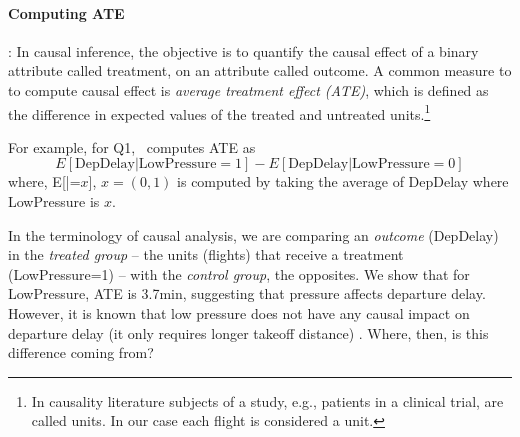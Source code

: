  \paragraph{ \bf Computing ATE}: In causal inference, the objective is to quantify
 the causal effect of a binary attribute called treatment, on an attribute called outcome.
 A common measure to to compute causal effect is {\em average treatment effect (ATE)}, which is defined as the difference in expected values of the treated and untreated units.\footnote{In causality literature subjects of a study,
  e.g., patients in a clinical trial, are called units. In our case each flight is considered a unit.}

 For example, for Q1, \GSQL\ computes ATE as $$E[\text{DepDelay}|\text{LowPressure}=1] - E[\text{DepDelay}|\text{LowPressure}=0]$$
  where, E[|=$x$], $x=(0,1)$ is computed by taking the average of  DepDelay where LowPressure is  $x$. 

In the terminology of causal analysis, we are comparing an
  \emph{outcome} (DepDelay) in the {\em treated group} -- the units
  (flights) that receive a treatment (LowPressure=1) -- with the {\em control group}, the opposites.
  We show that for LowPressure, ATE is 3.7min, suggesting that
  pressure affects departure delay. However, it is known that
  low pressure does not have any causal impact on departure delay (it
  only requires longer takeoff distance) \cite{FAA08}. Where, then, is
  this difference coming from?


